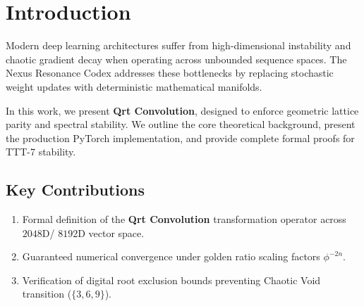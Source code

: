 \section{Introduction}
Modern deep learning architectures suffer from high-dimensional instability and chaotic gradient decay when operating across unbounded sequence spaces. The Nexus Resonance Codex addresses these bottlenecks by replacing stochastic weight updates with deterministic mathematical manifolds.

In this work, we present \textbf{Qrt Convolution}, designed to enforce geometric lattice parity and spectral stability. We outline the core theoretical background, present the production PyTorch implementation, and provide complete formal proofs for TTT-7 stability.

\subsection{Key Contributions}
\begin{enumerate}[label=\textbf{\arabic*.}]
    \item Formal definition of the \textbf{Qrt Convolution} transformation operator across $2048$D/ $8192$D vector space.
    \item Guaranteed numerical convergence under golden ratio scaling factors $\phi^{-2n}$.
    \item Verification of digital root exclusion bounds preventing Chaotic Void transition ($\{3, 6, 9\}$).
\end{enumerate}